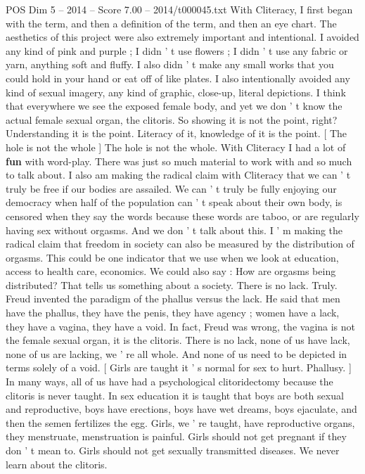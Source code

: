 \begin{textsample}{POS Dim 5 – 2014 – Score 7.00 – 2014/t000045.txt}
With Cliteracy, I first began with the term, and then a definition of the term, and then an eye chart.
The aesthetics of this project were also extremely important and intentional.
I avoided any kind of pink and purple ; I didn ' t use flowers ; I didn ' t use any fabric or yarn, anything soft and fluffy.
I also didn ' t make any small works that you could hold in your hand or eat off of like plates.
I also intentionally avoided any kind of sexual imagery, any kind of graphic, close-up, literal depictions.
I think that everywhere we see the exposed female body, and yet we don ' t know the actual female sexual organ, the clitoris.
So showing it is not the point, right?
Understanding it is the point.
Literacy of it, knowledge of it is the point. [ The hole is not the whole ] The hole is not the whole.
With Cliteracy I had a lot of \textbf{fun} with word-play.
There was just so much material to work with and so much to talk about.
I also am making the radical claim with Cliteracy that we can ' t truly be free if our bodies are assailed.
We can ' t truly be fully enjoying our democracy when half of the population can ' t speak about their own body, is censored when they say the words because these words are taboo, or are regularly having sex without orgasms.
And we don ' t talk about this.
I ' m making the radical claim that freedom in society can also be measured by the distribution of orgasms.
This could be one indicator that we use when we look at education, access to health care, economics.
We could also say : How are orgasms being distributed?
That tells us something about a society.
There is no lack.
Truly.
Freud invented the paradigm of the phallus versus the lack.
He said that men have the phallus, they have the penis, they have agency ; women have a lack, they have a vagina, they have a void.
In fact, Freud was wrong, the vagina is not the female sexual organ, it is the clitoris.
There is no lack, none of us have lack, none of us are lacking, we ' re all whole.
And none of us need to be depicted in terms solely of a void. [ Girls are taught it ' s normal for sex to hurt.
Phallusy. ] In many ways, all of us have had a psychological clitoridectomy because the clitoris is never taught.
In sex education it is taught that boys are both sexual and reproductive, boys have erections, boys have wet dreams, boys ejaculate, and then the semen fertilizes the egg.
Girls, we ' re taught, have reproductive organs, they menstruate, menstruation is painful.
Girls should not get pregnant if they don ' t mean to.
Girls should not get sexually transmitted diseases.
We never learn about the clitoris.

\end{textsample}
